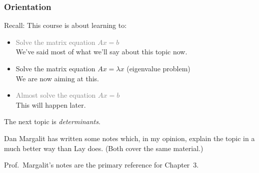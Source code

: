 



\begin{frame}
\frametitle{Orientation}

\alert{Recall:} This course is about learning to:

\begin{itemize}
\item \textcolor<2->{gray}{Solve the matrix equation $Ax = b$}\\
  \pause
  We've said most of what we'll say about this topic now.
  \pause
\item Solve the matrix equation $Ax = \lambda x$ (eigenvalue problem)\\
  \pause
  We are now aiming at this.
  \pause
\item \textcolor{gray}{Almost solve the equation $Ax = b$}\\
  \pause
  This will happen later.
\end{itemize}

\pause\bigskip
The next topic is \emph{determinants}.  

\pause\bigskip
Dan Margalit has written some notes
which, in my opinion, explain the topic in a much better way than Lay does.
\pause
(Both cover the same material.)

\pause\medskip
Prof.\ Margalit's notes are the primary reference for Chapter~3.

\end{frame}



